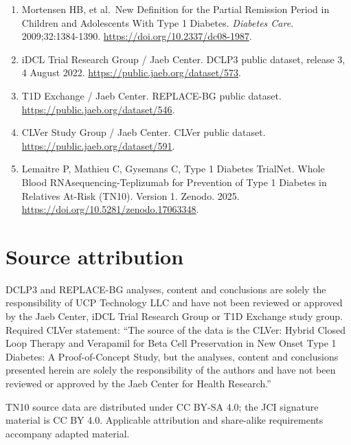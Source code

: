 \documentclass[
  american,
  11pt,
  letterpaper,
]{article}
\begin{document}
\begin{enumerate}
  teplizumab therapy resistance in different stages of type 1 diabetes.
  \emph{J Clin Invest}. 2025;135:e176403.
  \url{https://www.jci.org/articles/view/176403}. Fixed gene list:
  Supplemental Table 6.
\item
  Mortensen HB, et al.~New Definition for the Partial Remission Period
  in Children and Adolescents With Type 1 Diabetes. \emph{Diabetes
  Care}. 2009;32:1384-1390. \url{https://doi.org/10.2337/dc08-1987}.
\item
  iDCL Trial Research Group / Jaeb Center. DCLP3 public dataset, release
  3, 4 August 2022. \url{https://public.jaeb.org/dataset/573}.
\item
  T1D Exchange / Jaeb Center. REPLACE-BG public dataset.
  \url{https://public.jaeb.org/dataset/546}.
\item
  CLVer Study Group / Jaeb Center. CLVer public dataset.
  \url{https://public.jaeb.org/dataset/591}.
\item
  Lemaitre P, Mathieu C, Gysemans C, Type 1 Diabetes TrialNet. Whole
  Blood RNAsequencing-Teplizumab for Prevention of Type 1 Diabetes in
  Relatives At-Risk (TN10). Version 1. Zenodo. 2025.
  \url{https://doi.org/10.5281/zenodo.17063348}.
\end{enumerate}

\section{Source attribution}\label{source-attribution}

DCLP3 and REPLACE-BG analyses, content and conclusions are solely the
responsibility of UCP Technology LLC and have not been reviewed or
approved by the Jaeb Center, iDCL Trial Research Group or T1D Exchange
study group. Required CLVer statement: ``The source of the data is the
CLVer: Hybrid Closed Loop Therapy and Verapamil for Beta Cell
Preservation in New Onset Type 1 Diabetes: A Proof-of-Concept Study, but
the analyses, content and conclusions presented herein are solely the
responsibility of the authors and have not been reviewed or approved by
the Jaeb Center for Health Research.''

TN10 source data are distributed under CC BY-SA 4.0; the JCI signature
material is CC BY 4.0. Applicable attribution and share-alike
requirements accompany adapted material.
\end{document}
